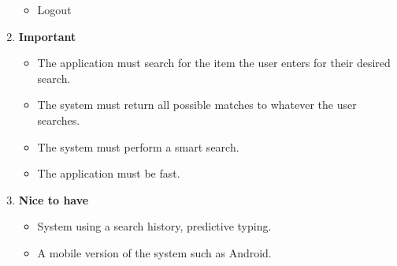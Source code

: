 \documentclass[a4paper,10pt]{article}
\begin{document}
\begin{enumerate}
\begin{itemize}
				\item Logout
			\end{itemize} 
		\item \textbf{Important} 
		\begin{itemize}
                \item The application must search for the item the user enters for their desired search. 
                \item The system must return all possible matches to whatever the user searches.
		\item The system must perform a smart search.
		\item The application must be fast.
                \end{itemize}
		
		\item \textbf{Nice to have}
		\begin{itemize}
		\item System using a search history, predictive typing. 
		\item A mobile version of the system such as Android.
		\end{itemize}
		\end{enumerate} 
\end{document}
